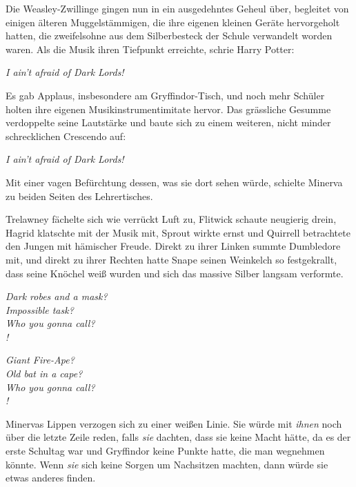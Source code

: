 Die Weasley-Zwillinge gingen nun in ein ausgedehntes Geheul über, begleitet von einigen älteren Muggelstämmigen, die ihre eigenen kleinen Geräte hervorgeholt hatten, die zweifelsohne aus dem Silberbesteck der Schule verwandelt worden waren. Als die Musik ihren Tiefpunkt erreichte, schrie Harry Potter:

\begin{center}
\emph{I ain’t afraid of Dark Lords!}
\end{center}

Es gab Applaus, insbesondere am Gryffindor-Tisch, und noch mehr Schüler holten ihre eigenen Musikinstrumentimitate hervor. Das grässliche Gesumme verdoppelte seine Lautstärke und baute sich zu einem weiteren, nicht minder schrecklichen Crescendo auf:

\begin{center}
\emph{I ain’t afraid of Dark Lords!}
\end{center}

Mit einer vagen Befürchtung dessen, was sie dort sehen würde, schielte Minerva zu beiden Seiten des Lehrertisches.

Trelawney fächelte sich wie verrückt Luft zu, Flitwick schaute neugierig drein, Hagrid klatschte mit der Musik mit, Sprout wirkte ernst und Quirrell betrachtete den Jungen mit hämischer Freude. Direkt zu ihrer Linken summte Dumbledore mit, und direkt zu ihrer Rechten hatte Snape seinen Weinkelch so festgekrallt, dass seine Knöchel weiß wurden und sich das massive Silber langsam verformte.

\begin{center}
\emph{Dark robes and a mask?\\
Impossible task?\\
Who you gonna call?\\
!}

\emph{Giant Fire-Ape?\\
Old bat in a cape?\\
Who you gonna call?\\
!}
\end{center}

Minervas Lippen verzogen sich zu einer weißen Linie. Sie würde mit \emph{ihnen} noch über die letzte Zeile reden, falls \emph{sie} dachten, dass sie keine Macht hätte, da es der erste Schultag war und Gryffindor keine Punkte hatte, die man wegnehmen könnte. Wenn \emph{sie} sich keine Sorgen um Nachsitzen machten, dann würde sie etwas anderes finden.

